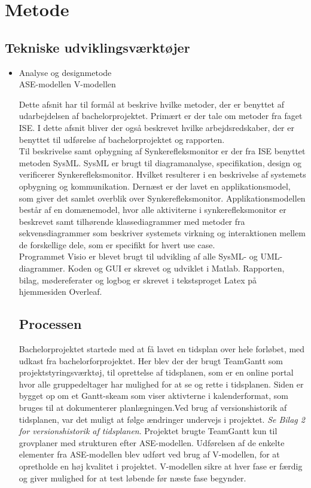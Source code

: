 \chapter{Metode}

\section{Tekniske udviklingsværktøjer}
\begin{itemize}
\item Analyse og designmetode\\
ASE-modellen
V-modellen

Dette afsnit har til formål at beskrive hvilke metoder, der er benyttet af udarbejdelsen af bachelorprojektet. Primært er der tale om metoder fra faget ISE. I dette afsnit bliver der også beskrevet hvilke arbejdsredskaber, der er benyttet til udførelse af bachelorprojektet og rapporten.\\

Til beskrivelse samt opbygning af Synkerefleksmonitor er der fra ISE benyttet metoden SysML. SysML er brugt til diagramanalyse, specifikation, design og verificerer Synkerefleksmonitor. Hvilket resulterer i en beskrivelse af systemets opbygning og kommunikation. Dernæst er der lavet en applikationsmodel, som giver det samlet overblik over Synkerefleksmonitor. Applikationsmodellen består af en domænemodel, hvor alle aktiviterne i synkerefleksmonitor er beskrevet samt tilhørende klassediagrammer med metoder fra sekvensdiagrammer som beskriver systemets virkning og interaktionen mellem de forskellige dele, som er specifikt for hvert use case.\\

Programmet Visio er blevet brugt til udvikling af alle SysML- og UML-diagrammer. Koden og GUI er skrevet og udviklet i Matlab. Rapporten, bilag, mødereferater og logbog er skrevet i tekstsproget Latex på hjemmesiden Overleaf. 

\section{Processen}

Bachelorprojektet startede med at få lavet en tidsplan over hele forløbet, med udkast fra bachelorforprojektet. Her blev der der brugt TeamGantt som projektstyringsværktøj, til oprettelse af tidsplanen, som er en online portal hvor alle gruppedeltager har mulighed for at se og rette i tidsplanen. Siden er bygget op om et Gantt-skeam som viser aktivterne i kalenderformat, som bruges til at dokumenterer planlægningen\cite[s. 297]{IntroductionCompendium}.Ved brug af versionshistorik af tidsplanen, var det muligt at følge ændringer undervejs i projektet. \textit{Se Bilag 2 for versionshistorik af tidsplanen}. Projektet brugte TeamGantt kun til grovplaner med strukturen efter ASE-modellen. Udførelsen af de enkelte elementer fra ASE-modellen blev udført ved brug af V-modellen, for at opretholde en høj kvalitet i projektet. V-modellen sikre at hver fase er færdig og giver mulighed for at test løbende før næste fase begynder\cite[s. 12]{DevelopmentASE}. 





\end{itemize}
